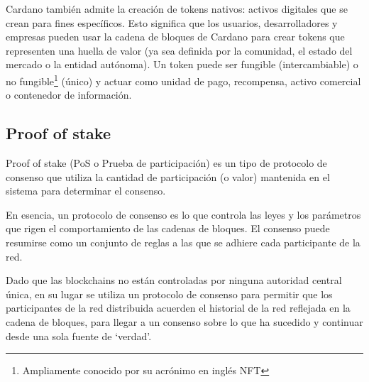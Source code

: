 \documentclass[12pt]{book}
\begin{document}
Cardano también admite la creación de tokens nativos: activos digitales que se crean para fines específicos. Esto significa que los usuarios, desarrolladores y empresas pueden usar la cadena de bloques de Cardano para crear tokens que representen una huella de valor (ya sea definida por la comunidad, el estado del mercado o la entidad autónoma). Un token puede ser fungible (intercambiable) o no fungible\footnote{Ampliamente conocido por su acrónimo en inglés NFT} (único) y actuar como unidad de pago, recompensa, activo comercial o contenedor de información.





\subsection{Proof of stake}

Proof of stake (PoS o Prueba de participación) es un tipo de protocolo de consenso que utiliza la cantidad de participación (o valor) mantenida en el sistema para determinar el consenso.

En esencia, un protocolo de consenso es lo que controla las leyes y los parámetros que rigen el comportamiento de las cadenas de bloques. El consenso puede resumirse como un conjunto de reglas a las que se adhiere cada participante de la red.

Dado que las blockchains no están controladas por ninguna autoridad central única, en su lugar se utiliza un protocolo de consenso para permitir que los participantes de la red distribuida acuerden el historial de la red reflejada en la cadena de bloques, para llegar a un consenso sobre lo que ha sucedido y continuar desde una sola fuente de `verdad'.
\end{document}
